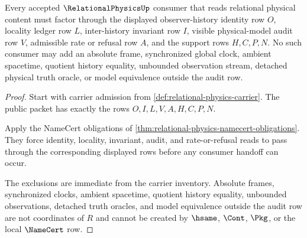 \begin{theorem}
\label{thm:relational-physics-invariant-route-exclusion}
Every accepted $\RelationalPhysicsUp$ consumer that reads relational physical content must factor through the displayed observer-history identity row $O$, locality ledger row $L$, inter-history invariant row $I$, visible physical-model audit row $V$, admissible rate or refusal row $A$, and the support rows $H,C,P,N$. No such consumer may add an absolute frame, synchronized global clock, ambient spacetime, quotient history equality, unbounded observation stream, detached physical truth oracle, or model equivalence outside the audit row.
\end{theorem}
\begin{proof}
Start with carrier admission from \autoref{def:relational-physics-carrier}. The public packet has exactly the rows $O,I,L,V,A,H,C,P,N$.

Apply the NameCert obligations of \autoref{thm:relational-physics-namecert-obligations}. They force identity, locality, invariant, audit, and rate-or-refusal reads to pass through the corresponding displayed rows before any consumer handoff can occur.

The exclusions are immediate from the carrier inventory. Absolute frames, synchronized clocks, ambient spacetime, quotient history equality, unbounded observations, detached truth oracles, and model equivalence outside the audit row are not coordinates of $R$ and cannot be created by $\hsame$, $\Cont$, $\Pkg$, or the local $\NameCert$ row.
\end{proof}

